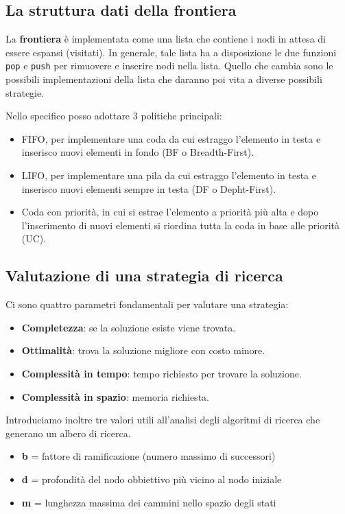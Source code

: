 \subsection{La struttura dati della frontiera}
La \textbf{frontiera} \`e implementata come una lista che contiene i nodi in attesa di essere
espansi (visitati). In generale, tale lista ha a disposizione le due funzioni \verb|pop| e
\verb|push| per rimuovere e inserire nodi nella lista. Quello che cambia sono le possibili
implementazioni della lista che daranno poi vita a diverse possibili strategie.

Nello specifico posso adottare 3 politiche principali:
\begin{itemize}
	\item FIFO, per implementare una coda da cui estraggo l'elemento in testa e inserisco
	      nuovi elementi in fondo (BF o Breadth-First).
	\item LIFO, per implementare una pila da cui estraggo l'elemento in testa e inserisco nuovi
	      elementi sempre in testa (DF o Depht-First).
	\item Coda con priorit\`a, in cui si estrae l'elemento a priorit\`a pi\`u alta e dopo
	      l'inserimento di nuovi elementi si riordina tutta la coda in base alle priorit\`a
	      (UC).
\end{itemize}

\subsection{Valutazione di una strategia di ricerca}
Ci sono quattro parametri fondamentali per valutare una strategia:
\begin{itemize}
	\item \textbf{Completezza}: se la soluzione esiste viene trovata.
	\item \textbf{Ottimalit\`a}: trova la soluzione migliore con costo minore.
	\item \textbf{Complessit\`a in tempo}: tempo richiesto per trovare la soluzione.
	\item \textbf{Complessit\`a in spazio}: memoria richiesta.
\end{itemize}
Introduciamo inoltre tre valori utili all'analisi degli algoritmi di ricerca che generano
un albero di ricerca.
\begin{itemize}
	\item \textbf b = fattore di ramificazione (numero massimo di successori)
	\item \textbf d = profondit\`a del nodo obbiettivo pi\`u vicino al nodo iniziale
	\item \textbf m = lunghezza massima dei cammini nello spazio degli stati
\end{itemize}

